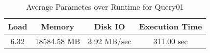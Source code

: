 \documentclass[../../main.tex]{subfiles}
\begin{document}
    \begin{table}
        \begin{center}
            \begin{tabular}{ |c|c|c|c| } 
            \hline
            Load & Memory & Disk IO & Execution Time\\
            \hline
            6.32 & 18584.58 MB & 3.92 MB/sec & 311.00 sec \\
            \hline
            \end{tabular}
            \\[1pt]
            \caption{Average Parametes over Runtime for Query01}
        \end{center}
    \end{table}
    \pagebreak
\end{document}
